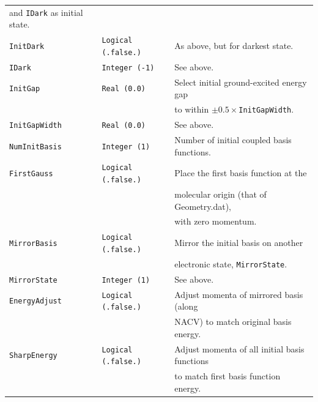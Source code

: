 \documentclass[11pt]{article}
\begin{document}
\begin{table}[h]
\begin{tabular}{ l l l }
                                                  {\small and {\tt IDark} as initial state.}\\
{\tt InitDark}       &{\tt Logical (.false.)}   & {\small As above, but for darkest state.}\\
{\tt IDark}          &{\tt Integer (-1)}        & {\small See above.}\\
{\tt InitGap}        &{\tt Real (0.0)}          & {\small Select initial ground-excited energy gap}\\&&
                                                  {\small to within $\pm 0.5\times${\tt InitGapWidth}.}\\
{\tt InitGapWidth}   &{\tt Real (0.0)}          & {\small See above.}\\
{\tt NumInitBasis}   &{\tt Integer (1)}         & {\small Number of initial coupled basis functions.}\\
{\tt FirstGauss}     &{\tt Logical (.false.)}   & {\small Place the first basis function at the}\\&&
                                                  {\small molecular origin (that of Geometry.dat),}\\&&
                                                  {\small with zero momentum.}\\
{\tt MirrorBasis}    &{\tt Logical (.false.)}   & {\small Mirror the initial basis on another }\\&&
                                                  {\small electronic state, {\tt MirrorState}.}\\
{\tt MirrorState}    &{\tt Integer (1)}         & {\small See above.}\\
{\tt EnergyAdjust}   &{\tt Logical (.false.)}   & {\small Adjust momenta of mirrored basis (along}\\&&
                                                  {\small NACV) to match original basis energy.}\\
{\tt SharpEnergy}    &{\tt Logical (.false.)}   & {\small Adjust momenta of all initial basis functions}\\&&
                                                  {\small to match first basis function energy.}\\
\hline\hline
\end{tabular}
\end{table}
\end{document}
